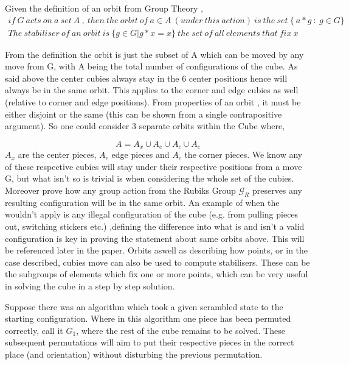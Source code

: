 \documentclass{article}
\begin{document}
Given the definition of an orbit from Group Theory ,
\begin{equation}
\begin{aligned}
if\ G\ acts\ on\ a\ set\ A\ ,\ then\ the\ orbit\ of\ a \in A\ (under\ this\ action)\ is\ the\ set\ \{\ a*g\ :\ g \in G\} \\
The\ stabiliser\ of\ an\ orbit\ is\ \{g\in G | g*x = x\}\ the\ set\ of\ all\ elements\ that\ fix\ x
\end{aligned}
\end{equation}

From the definition the orbit is just the subset of A which can be moved by any move from G, with A being the total number of configurations of the cube. As said above the center cubies always stay in the 6 center positions hence will always be in the same orbit. This applies to the corner and edge cubies as well (relative to corner and edge positions). 
From properties of an orbit , it must be either disjoint or the same (this can be shown from a single contrapositive argument). So one could consider 3 separate orbits within the Cube where,

\begin{equation}
A = A_{x}\cup A_{e}\cup A_{c}\cup A_{e}
\end{equation} 
$A_{x}$ are the center pieces, $A_{e}$ edge pieces and $A_{c}$ the corner pieces. We know any of these respective cubies will stay under their respective positions from a move G, but what isn't so is trivial is when considering the whole set of the cubies. Moreover prove how any group action from the Rubiks Group $\mathcal{G}_{R}$ preserves any resulting configuration will be in the same orbit.\cite{Harvard} 
An example of when the wouldn't apply is any illegal configuration of the cube (e.g. from pulling pieces out, switching stickers etc.) ,defining the difference into what is and isn't a valid configuration is key in proving the statement about same orbits above. This will be referenced later in the paper.
Orbits aswell as describing how points, or in the case described, cubies move can also be used to compute stabilisers. These can be the subgroups of elements which fix one or more points, which can be very useful in solving the cube in a step by step solution.\cite{PermGroups}

Suppose there was an algorithm which took a given scrambled state to the starting configuration. Where in this algorithm one piece has been permuted correctly, call it $G_{1}$, where the rest of the cube remains to be solved. These subsequent permutations will aim to put their respective pieces in the correct place (and orientation) without disturbing the previous permutation.   
\end{document}
